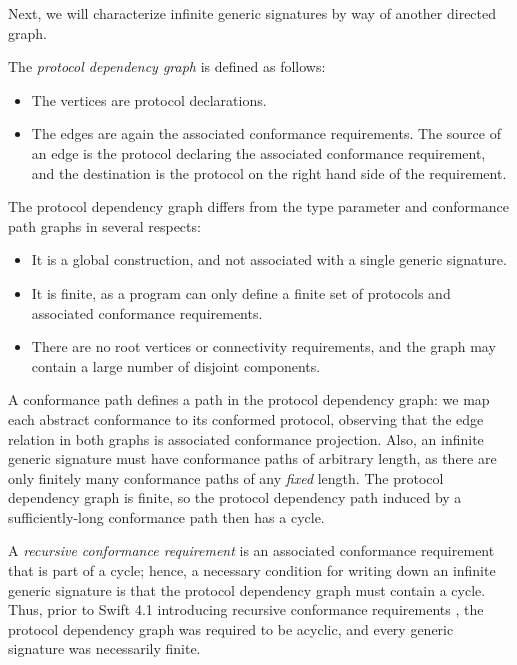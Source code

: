 \documentclass[../generics]{subfiles}
\begin{document}
Next, we will characterize infinite generic signatures by way of another directed graph.

\begin{definition}
The \emph{protocol dependency graph} is defined as follows:
\begin{itemize}
\item The vertices are protocol declarations.
\item The edges are again the associated conformance requirements. The source of an edge is the protocol declaring the associated conformance requirement, and the destination is the protocol on the right hand side of the requirement.
\end{itemize}
\end{definition}
The protocol dependency graph differs from the type parameter and conformance path graphs in several respects:
\begin{itemize}
\item It is a global construction, and not associated with a single generic signature.
\item It is finite, as a program can only define a finite set of protocols and associated conformance requirements.
\item There are no root vertices or connectivity requirements, and the graph may contain a large number of disjoint components.
\end{itemize}

A conformance path defines a path in the protocol dependency graph: we map each abstract conformance to its conformed protocol, observing that the edge relation in both graphs is associated conformance projection. Also, an infinite generic signature must have conformance paths of arbitrary length, as there are only finitely many conformance paths of any \emph{fixed} length. The protocol dependency graph is finite, so the protocol dependency path induced by a sufficiently-long conformance path then has a cycle.

A \emph{recursive conformance requirement} is an associated conformance requirement that is part of a cycle; hence, a necessary condition for writing down an infinite generic signature is that the protocol dependency graph must contain a cycle. Thus, prior to Swift 4.1 introducing recursive conformance requirements \cite{se0157}, the protocol dependency graph was required to be acyclic, and every generic signature was necessarily finite.
\end{document}
